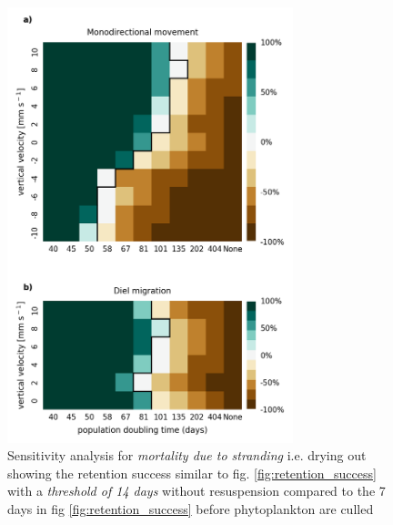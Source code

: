 \documentclass[npg, manuscript]{copernicus}
\begin{document}
\begin{figure}
    \includegraphics[width=8.3cm]{retention_success_sa_27.png}
    \caption[]{
        Sensitivity analysis for \textit{mortality due to stranding} i.e. drying out showing the retention success similar to fig. \ref{fig:retention_success} with a \textit{threshold of 14 days} without resuspension compared to the 7 days in fig \ref{fig:retention_success} before phytoplankton are culled
    }
    \label{fig:retention_success_long_stranding}
\end{figure}
\clearpage
\end{document}
